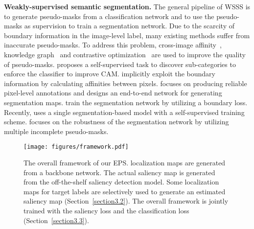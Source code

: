 \documentclass[final]{cvpr}
\begin{document}
\noindent\textbf{Weakly-supervised semantic segmentation.}
The general pipeline of WSSS is to generate pseudo-masks from a classification network and to use the pseudo-masks as supervision to train a segmentation network. Due to the scarcity of boundary information in the image-level label, many existing methods suffer from inaccurate pseudo-masks. To address this problem, cross-image affinity~\cite{fan2020cian}, knowledge graph~\cite{liu2020leveraging} and contrastive optimization~\cite{sun2020mining, zhang2020splitting} are used to improve the quality of pseudo-masks. \cite{chang2020weakly} proposes a self-supervised task to discover sub-categories to enforce the classifier to improve CAM. \cite{ahn2019weakly, ahn2018learning} implicitly exploit the boundary information by calculating affinities between pixels. \cite{zhang2020reliability} focuses on producing reliable pixel-level annotations and designs an end-to-end network for generating segmentation maps. \cite{huang2018weakly, kolesnikov2016seed} train the segmentation network by utilizing a boundary loss. Recently, \cite{araslanov2020single} uses a single segmentation-based model with a self-supervised training scheme. \cite{fan2020employing} focuses on the robustness of the segmentation network by utilizing multiple incomplete pseudo-masks.

\begin{figure*}[t]
\centering
\texttt{[image: figures/framework.pdf]}
\caption{The overall framework of our EPS.  localization maps are generated from a backbone network. The actual saliency map is generated from the off-the-shelf saliency detection model. Some localization maps for target labels are selectively used to generate an estimated saliency map (Section~\ref{section3.2}). The overall framework is jointly trained with the saliency loss and the classification loss (Section~\ref{section3.3}). } \vspace{-2mm}
\label{fig:framework}
\end{figure*}
 
\end{document}
